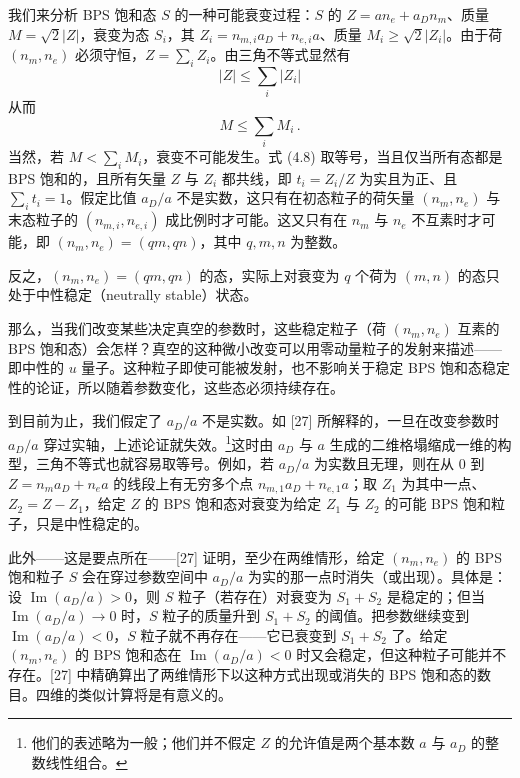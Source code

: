 \documentclass[11pt,a4paper,UTF8,fontset=fandol]{ctexart}
\theoremstyle{plain}
\theoremstyle{definition}
\renewcommand{\Im}{\operatorname{Im}}
\begin{document}
我们来分析 BPS 饱和态 $S$ 的一种可能衰变过程：$S$ 的 $Z=an_e+a_Dn_m$、质量 $M=\sqrt2|Z|$，衰变为态 $S_i$，其 $Z_i=n_{m,i}a_D+n_{e,i}a$、质量 $M_i\ge\sqrt2|Z_i|$。由于荷 $(n_m,n_e)$ 必须守恒，$Z=\sum_iZ_i$。由三角不等式显然有
\begin{equation}
  |Z|\le\sum_i|Z_i| \tag{4.8}
\end{equation}
从而
\begin{equation}
  M\le\sum_iM_i\,. \tag{4.9}
\end{equation}
当然，若 $M<\sum_iM_i$，衰变不可能发生。式 (4.8) 取等号，当且仅当所有态都是 BPS 饱和的，且所有矢量 $Z$ 与 $Z_i$ 都共线，即 $t_i=Z_i/Z$ 为实且为正、且 $\sum_it_i=1$。假定比值 $a_D/a$ 不是实数，这只有在初态粒子的荷矢量 $(n_m,n_e)$ 与末态粒子的 $(n_{m,i},n_{e,i})$ 成比例时才可能。这又只有在 $n_m$ 与 $n_e$ 不互素时才可能，即 $(n_m,n_e)=(qm,qn)$，其中 $q,m,n$ 为整数。

反之，$(n_m,n_e)=(qm,qn)$ 的态，实际上对衰变为 $q$ 个荷为 $(m,n)$ 的态只处于中性稳定（neutrally stable）状态。

那么，当我们改变某些决定真空的参数时，这些稳定粒子（荷 $(n_m,n_e)$ 互素的 BPS 饱和态）会怎样？真空的这种微小改变可以用零动量粒子的发射来描述——即中性的 $u$ 量子。这种粒子即使可能被发射，也不影响关于稳定 BPS 饱和态稳定性的论证，所以随着参数变化，这些态必须持续存在。

到目前为止，我们假定了 $a_D/a$ 不是实数。如 [27] 所解释的，一旦在改变参数时 $a_D/a$ 穿过实轴，上述论证就失效。\footnote{他们的表述略为一般；他们并不假定 $Z$ 的允许值是两个基本数 $a$ 与 $a_D$ 的整数线性组合。}这时由 $a_D$ 与 $a$ 生成的二维格塌缩成一维的构型，三角不等式也就容易取等号。例如，若 $a_D/a$ 为实数且无理，则在从 $0$ 到 $Z=n_ma_D+n_ea$ 的线段上有无穷多个点 $n_{m,1}a_D+n_{e,1}a$；取 $Z_1$ 为其中一点、$Z_2=Z-Z_1$，给定 $Z$ 的 BPS 饱和态对衰变为给定 $Z_1$ 与 $Z_2$ 的可能 BPS 饱和粒子，只是中性稳定的。

此外——这是要点所在——[27] 证明，至少在两维情形，给定 $(n_m,n_e)$ 的 BPS 饱和粒子 $S$ 会在穿过参数空间中 $a_D/a$ 为实的那一点时消失（或出现）。具体是：设 $\Im(a_D/a)>0$，则 $S$ 粒子（若存在）对衰变为 $S_1+S_2$ 是稳定的；但当 $\Im(a_D/a)\to0$ 时，$S$ 粒子的质量升到 $S_1+S_2$ 的阈值。把参数继续变到 $\Im(a_D/a)<0$，$S$ 粒子就不再存在——它已衰变到 $S_1+S_2$ 了。给定 $(n_m,n_e)$ 的 BPS 饱和态在 $\Im(a_D/a)<0$ 时又会稳定，但这种粒子可能并不存在。[27] 中精确算出了两维情形下以这种方式出现或消失的 BPS 饱和态的数目。四维的类似计算将是有意义的。
\end{document}
